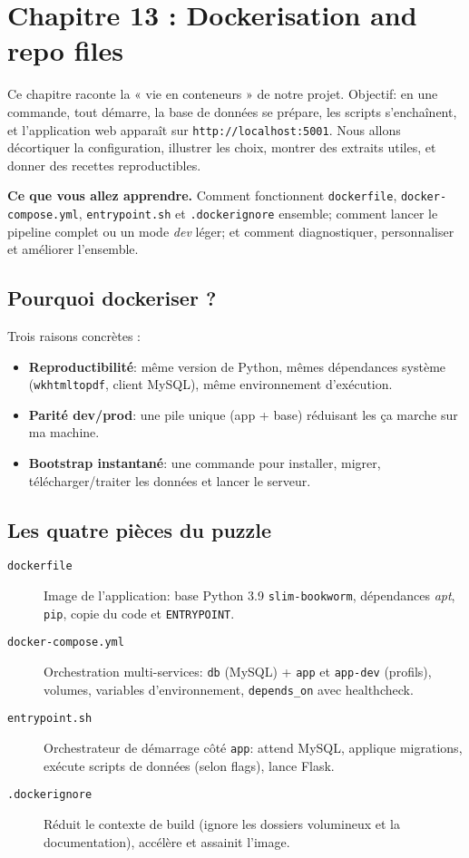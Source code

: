 \chapter{Chapitre 13 : Dockerisation and repo files}

Ce chapitre raconte la « vie en conteneurs » de notre projet. Objectif: en une commande, tout démarre, la base de données se prépare, les scripts s'enchaînent, et l'application web apparaît sur \texttt{http://localhost:5001}. Nous allons décortiquer la configuration, illustrer les choix, montrer des extraits utiles, et donner des recettes reproductibles.

\medskip
\noindent\textbf{Ce que vous allez apprendre.} Comment fonctionnent \texttt{dockerfile}, \texttt{docker-compose.yml}, \texttt{entrypoint.sh} et \texttt{.dockerignore} ensemble; comment lancer le pipeline complet ou un mode \textit{dev} léger; et comment diagnostiquer, personnaliser et améliorer l'ensemble.

\section{Pourquoi dockeriser ?}

Trois raisons concrètes :
\begin{itemize}
  \item \textbf{Reproductibilité}: même version de Python, mêmes dépendances système (\texttt{wkhtmltopdf}, client MySQL), même environnement d'exécution.
  \item \textbf{Parité dev/prod}: une pile unique (app + base) réduisant les \og ça marche sur ma machine\fg{}.
  \item \textbf{Bootstrap instantané}: une commande pour installer, migrer, télécharger/traiter les données et lancer le serveur.
\end{itemize}

\section{Les quatre pièces du puzzle}

\begin{description}
  \item[\texttt{dockerfile}] Image de l'application: base Python 3.9 \texttt{slim-bookworm}, dépendances \textit{apt}, \texttt{pip}, copie du code et \texttt{ENTRYPOINT}.
  \item[\texttt{docker-compose.yml}] Orchestration multi-services: \texttt{db} (MySQL) + \texttt{app} et \texttt{app-dev} (profils), volumes, variables d'environnement, \texttt{depends\_on} avec healthcheck.
  \item[\texttt{entrypoint.sh}] Orchestrateur de démarrage côté \texttt{app}: attend MySQL, applique migrations, exécute scripts de données (selon flags), lance Flask.
  \item[\texttt{.dockerignore}] Réduit le contexte de build (ignore les dossiers volumineux et la documentation), accélère et assainit l'image.
\end{description}

